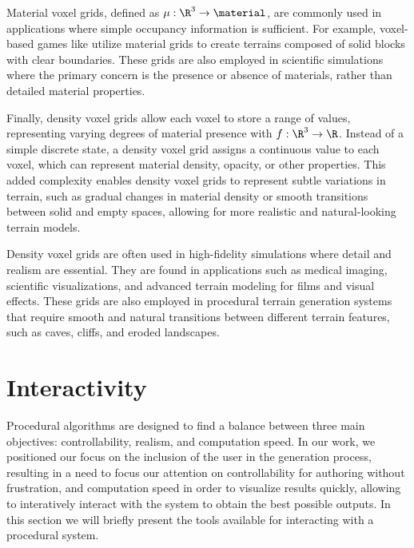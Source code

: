 Material voxel grids, defined as $\mu: \R^3 \to \material$, are commonly used in applications where simple occupancy information is sufficient. For example, voxel-based games like  utilize material grids to create terrains composed of solid blocks with clear boundaries. These grids are also employed in scientific simulations where the primary concern is the presence or absence of materials, rather than detailed material properties.

Finally, density voxel grids allow each voxel to store a range of values, representing varying degrees of material presence with $f: \R^3 \to \R$. Instead of a simple discrete state, a density voxel grid assigns a continuous value to each voxel, which can represent material density, opacity, or other properties. This added complexity enables density voxel grids to represent subtle variations in terrain, such as gradual changes in material density or smooth transitions between solid and empty spaces, allowing for more realistic and natural-looking terrain models.


Density voxel grids are often used in high-fidelity simulations where detail and realism are essential. They are found in applications such as medical imaging, scientific visualizations, and advanced terrain modeling for films and visual effects. These grids are also employed in procedural terrain generation systems that require smooth and natural transitions between different terrain features, such as caves, cliffs, and eroded landscapes.




\section{Interactivity}
Procedural algorithms are designed to find a balance between three main objectives: controllability, realism, and computation speed.
In our work, we positioned our focus on the inclusion of the user in the generation process, resulting in a need to focus our attention on controllability for authoring without frustration, and computation speed in order to visualize results quickly, allowing to interatively interact with the system to obtain the best possible outputs. In this section we will briefly present the tools available for interacting with a procedural system.


